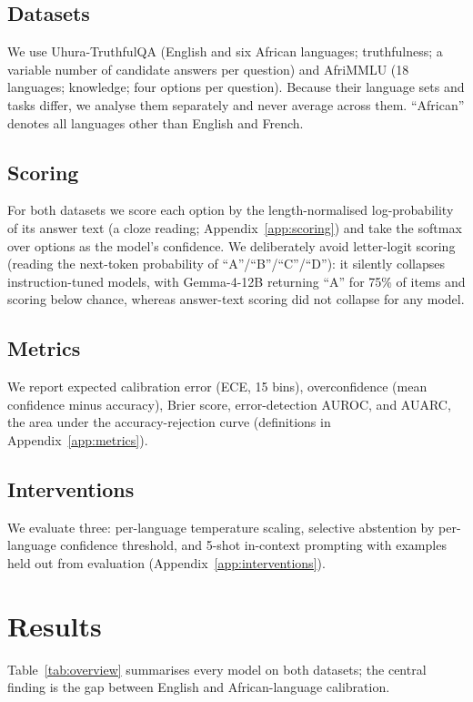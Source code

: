 \documentclass[pmlr]{jmlr}%
\begin{document}
\subsection{Datasets}
We use Uhura-TruthfulQA \citep{uhura} (English and six African languages; truthfulness; a variable
number of candidate answers per question) and AfriMMLU \citep{irokobench} (18 languages; knowledge;
four options per question). Because their language sets and tasks differ, we analyse them separately
and never average across them. ``African'' denotes all languages other than English and French.

\subsection{Scoring}
For both datasets we score each option by the length-normalised log-probability of its answer text
(a cloze reading; Appendix~\ref{app:scoring}) and take the softmax over options as the model's
confidence. We deliberately avoid letter-logit scoring (reading the next-token probability of
``A''/``B''/``C''/``D''): it silently collapses instruction-tuned models, with Gemma-4-12B returning
``A'' for 75\% of items and scoring below chance, whereas answer-text scoring did not collapse for any model.

\subsection{Metrics}
We report expected calibration error (ECE, 15 bins), overconfidence (mean confidence minus accuracy),
Brier score, error-detection AUROC, and AUARC, the area under the accuracy-rejection curve
(definitions in Appendix~\ref{app:metrics}).

\subsection{Interventions}
We evaluate three: per-language temperature scaling, selective abstention by per-language confidence
threshold, and 5-shot in-context prompting with examples held out from evaluation
(Appendix~\ref{app:interventions}).

\section{Results}\label{sec:results}
Table~\ref{tab:overview} summarises every model on both datasets; the central finding is the gap
between English and African-language calibration.
\end{document}
